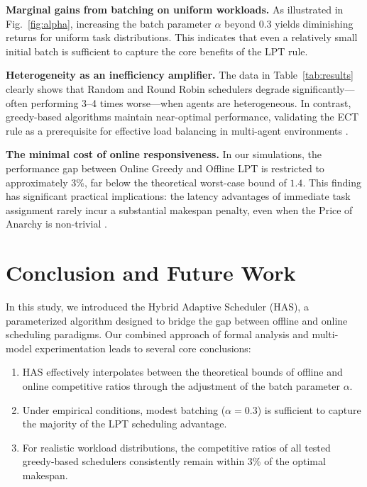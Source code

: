 \documentclass[conference]{IEEEtran}
\begin{document}
\textbf{Marginal gains from batching on uniform workloads.} As illustrated in Fig.~\ref{fig:alpha}, increasing the batch parameter $\alpha$ beyond 0.3 yields diminishing returns for uniform task distributions. This indicates that even a relatively small initial batch is sufficient to capture the core benefits of the LPT rule.

\textbf{Heterogeneity as an inefficiency amplifier.} The data in Table~\ref{tab:results} clearly shows that Random and Round Robin schedulers degrade significantly---often performing 3--4 times worse---when agents are heterogeneous. In contrast, greedy-based algorithms maintain near-optimal performance, validating the ECT rule as a prerequisite for effective load balancing in multi-agent environments \cite{mitzenmacher2001}.

\textbf{The minimal cost of online responsiveness.} In our simulations, the performance gap between Online Greedy and Offline LPT is restricted to approximately 3\%, far below the theoretical worst-case bound of $1.4$. This finding has significant practical implications: the latency advantages of immediate task assignment rarely incur a substantial makespan penalty, even when the Price of Anarchy is non-trivial \cite{koutsoupias1999}.

\section{Conclusion and Future Work}

In this study, we introduced the Hybrid Adaptive Scheduler (HAS), a parameterized algorithm designed to bridge the gap between offline and online scheduling paradigms. Our combined approach of formal analysis and multi-model experimentation leads to several core conclusions:

\begin{enumerate}
    \item HAS effectively interpolates between the theoretical bounds of offline and online competitive ratios through the adjustment of the batch parameter $\alpha$.
    \item Under empirical conditions, modest batching ($\alpha = 0.3$) is sufficient to capture the majority of the LPT scheduling advantage.
    \item For realistic workload distributions, the competitive ratios of all tested greedy-based schedulers consistently remain within 3\% of the optimal makespan.
\end{enumerate}
\end{document}
